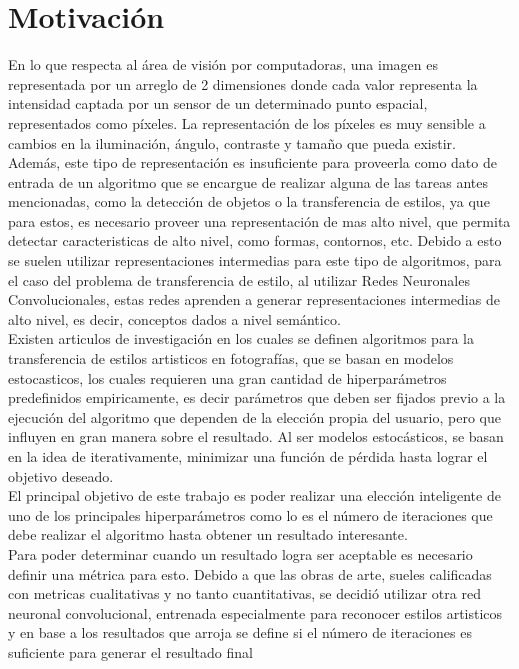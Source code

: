 \documentclass[a4paper,11pt,spanish]{book}
\begin{document}
  \section {Motivación}
    En lo que respecta al área de visión por computadoras, una imagen es representada por un arreglo de 2 dimensiones donde cada valor representa la intensidad captada por un sensor
    de un determinado punto espacial, representados como píxeles. La representación de los píxeles es muy sensible a cambios en la iluminación, ángulo, contraste y tamaño que pueda existir.\\
    Además, este tipo de representación es insuficiente para proveerla como dato de entrada de un algoritmo que se encargue de realizar alguna de las tareas antes mencionadas, como la
    detección de objetos o la transferencia de estilos, ya que para estos, es necesario proveer una representación de mas alto nivel, que permita detectar caracteristicas de alto nivel,
    como formas, contornos, etc. Debido a esto se suelen utilizar representaciones intermedias para este tipo de algoritmos, para el caso del problema de transferencia de estilo,
    al utilizar Redes Neuronales Convolucionales, estas redes aprenden a generar representaciones intermedias de alto nivel, es decir, conceptos dados a nivel semántico.\\
    Existen articulos de investigación en los cuales se definen algoritmos para la transferencia de estilos artisticos en fotografías, que se basan en modelos estocasticos,
    los cuales requieren una gran cantidad de hiperparámetros predefinidos empiricamente, es decir parámetros que deben ser fijados previo a la ejecución del algoritmo que dependen
    de la elección propia del usuario, pero que influyen en gran manera sobre el resultado. Al ser modelos estocásticos, se basan en la idea de iterativamente,
    minimizar una función de pérdida hasta lograr el objetivo deseado. \\
    El principal objetivo de este trabajo es poder realizar una elección inteligente de uno de los principales hiperparámetros como lo es el número de iteraciones
    que debe realizar el algoritmo hasta obtener un resultado interesante. \\
    Para poder determinar cuando un resultado logra ser aceptable es necesario definir una métrica para esto.
    Debido a que las obras de arte, sueles calificadas con metricas cualitativas y no tanto cuantitativas, se decidió utilizar otra red neuronal convolucional,
    entrenada especialmente para reconocer estilos artisticos y en base a los resultados que arroja se define si el número de iteraciones es suficiente para generar el resultado final
\end{document}
